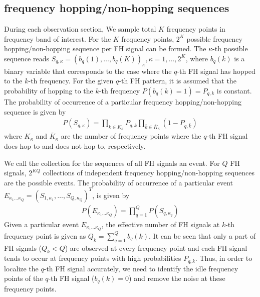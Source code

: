 \documentclass[journal,10pt]{IEEEtran}
\begin{document}
\subsection{frequency hopping/non-hopping sequences}
During each observation section, We sample total $K$ frequency points in frequency band of interest. For the $K$ frequency points, $2^K$ possible frequency hopping/non-hopping sequence per FH signal can be formed.
The $\kappa$-th possible sequence reads $S_{q,\kappa}=(b_q(1),\dots, b_q(K))_\kappa,\kappa=1,\dots,2^K$, where $b_q(k)$ is a binary variable that corresponds to the case 
where the $q$-th FH signal has hopped to the $k$-th frequency. For the given $q$-th FH pattern, it is assumed that the probability of hopping to the $k$-th frequency $P(b_q(k)=1)=P_{q,k}$ is constant.
The probability of occurrence of a particular frequency hopping/non-hopping sequence is given by
\begin{align}\label{eq:6}
    P(S_{q,\kappa})=\prod_{k\in K_\kappa}P_{q,k}\prod_{\bar{k}\in \bar{K}_\kappa}(1-P_{q,\bar{k}})
\end{align}
where $K_\kappa$ and $\bar{K}_\kappa$ are the number of frequency points where the $q$-th FH signal does hop to and does not hop to, respectively.

We call the collection for the sequences of all FH signals an event. For $Q$ FH signals, $2^{KQ}$ collections of independent frequency hopping/non-hopping sequences are the possible events.
The probability of occurrence of a particular event $E_{\kappa_1\dots\kappa_Q}=(S_{1,\kappa_1},\dots,S_{Q,\kappa_Q})^T$, is given by 
\begin{align}\label{eq:7}
    P(E_{\kappa_1\dots\kappa_Q})=\prod_{q=1}^Q P(S_{q,\kappa_q})
\end{align}
Given a particular event $E_{\kappa_1\dots\kappa_Q}$, the effective number of FH signals at $k$-th frequency point is given as $Q_k=\sum_{q=1}^Q b_q(k)$. 
It can be seen that only a part of FH signals ($Q_k<Q$) are observed at every frequency point and each FH signal tends to occur at frequency points with high probabilities $P_{q,k}$.
Thus, in order to localize the $q$-th FH signal accurately, we need to identify the idle frequency points of the $q$-th FH signal ($b_q(k)=0$) and remove the noise at these frequency points.
\end{document}
